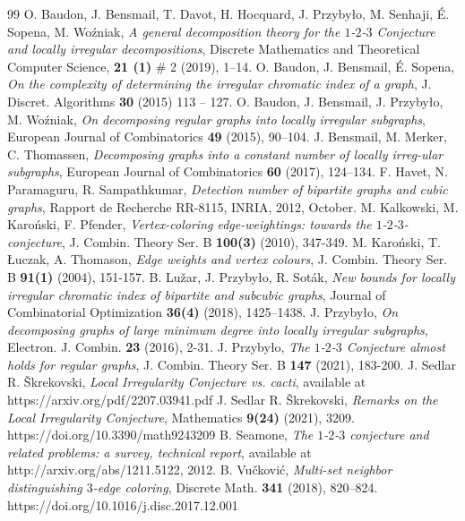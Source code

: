 \documentclass[12pt]{article}
\begin{document}
\begin{thebibliography}{99}
O. Baudon, J. Bensmail, T. Davot, H. Hocquard, J. Przybyło, M. Senhaji, \'E. Sopena, M. Woźniak, \textit{A general decomposition theory for the $1$-$2$-$3$ Conjecture and locally irregular decompositions}, Discrete Mathematics and Theoretical Computer Science, {\bf 21 (1)} $\#$ 2 (2019), 1–14.
O. Baudon, J. Bensmail, \'E. Sopena, \textit{On the complexity of determining the irregular chromatic index of a graph}, J. Discret. Algorithms {\bf 30} (2015) 113 -- 127.
O. Baudon, J. Bensmail, J. Przybyło, M. Woźniak, \textit{On decomposing regular graphs into locally irregular subgraphs}, European Journal
of Combinatorics {\bf 49} (2015), 90–104.
J. Bensmail, M. Merker, C. Thomassen, \textit{Decomposing graphs into a constant number of locally irreg-ular subgraphs}, European Journal of
Combinatorics {\bf 60} (2017), 124–134.
 F. Havet, N. Paramaguru, R. Sampathkumar, \textit{Detection number of bipartite graphs and cubic graphs}, Rapport de Recherche
RR-8115, INRIA, 2012, October. 
M. Kalkowski, M. Karoński, F. Pfender, \textit{Vertex-coloring edge-weightings: towards the $1$-$2$-$3$-conjecture}, J. Combin. Theory Ser. B {\bf 100(3)} (2010), 347-349.
M. Karoński, T.  Łuczak, A. Thomason, \textit{Edge weights and vertex colours}, J. Combin. Theory Ser. B {\bf91(1)} (2004), 151-157.
B. Lu\v zar, J. Przybyło, R. Soták, \textit{New bounds for locally irregular chromatic index of bipartite and subcubic graphs}, Journal of Combinatorial
Optimization {\bf 36(4)} (2018), 1425–1438.
J. Przybyło, \textit{On decomposing graphs of large minimum degree into locally irregular subgraphs}, Electron. J. Combin. {\bf 23}  (2016), 2-31.
J. Przybyło, \textit{The $1$-$2$-$3$ Conjecture almost holds for regular graphs}, J. Combin. Theory Ser. B {\bf147} (2021), 183-200.
J. Sedlar R. \v Skrekovski, \textit{Local Irregularity Conjecture vs. cacti}, available at https://arxiv.org/pdf/2207.03941.pdf
J. Sedlar R. \v Skrekovski, \textit{Remarks on the Local Irregularity Conjecture}, Mathematics {\bf9(24)} (2021), 3209. https://doi.org/10.3390/math9243209
B. Seamone,  \textit{The $1$-$2$-$3$ conjecture and related problems: a survey, technical report}, available at http://arxiv.org/abs/1211.5122, 2012.
B. Vu\v cković, \textit{Multi-set neighbor distinguishing $3$-edge coloring}, Discrete Math. {\bf 341} (2018), 820–824.
https://doi.org/10.1016/j.disc.2017.12.001
\end{thebibliography}
\end{document}
